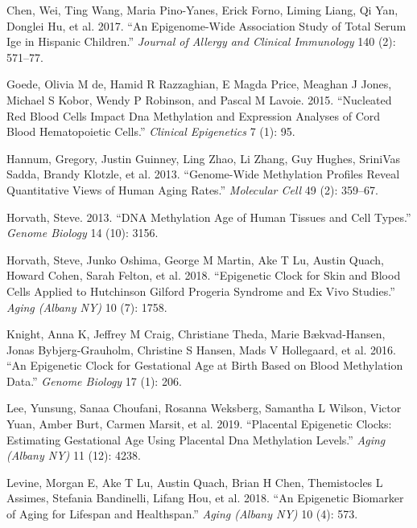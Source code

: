 \documentclass[]{article}
\begin{document}
\leavevmode\hypertarget{ref-chen2017epigenome}{}%
Chen, Wei, Ting Wang, Maria Pino-Yanes, Erick Forno, Liming Liang, Qi Yan, Donglei Hu, et al. 2017. ``An Epigenome-Wide Association Study of Total Serum Ige in Hispanic Children.'' \emph{Journal of Allergy and Clinical Immunology} 140 (2): 571--77.

\leavevmode\hypertarget{ref-de2015nucleated}{}%
Goede, Olivia M de, Hamid R Razzaghian, E Magda Price, Meaghan J Jones, Michael S Kobor, Wendy P Robinson, and Pascal M Lavoie. 2015. ``Nucleated Red Blood Cells Impact Dna Methylation and Expression Analyses of Cord Blood Hematopoietic Cells.'' \emph{Clinical Epigenetics} 7 (1): 95.

\leavevmode\hypertarget{ref-hannum2013genome}{}%
Hannum, Gregory, Justin Guinney, Ling Zhao, Li Zhang, Guy Hughes, SriniVas Sadda, Brandy Klotzle, et al. 2013. ``Genome-Wide Methylation Profiles Reveal Quantitative Views of Human Aging Rates.'' \emph{Molecular Cell} 49 (2): 359--67.

\leavevmode\hypertarget{ref-horvath2013dna}{}%
Horvath, Steve. 2013. ``DNA Methylation Age of Human Tissues and Cell Types.'' \emph{Genome Biology} 14 (10): 3156.

\leavevmode\hypertarget{ref-horvath2018epigenetic}{}%
Horvath, Steve, Junko Oshima, George M Martin, Ake T Lu, Austin Quach, Howard Cohen, Sarah Felton, et al. 2018. ``Epigenetic Clock for Skin and Blood Cells Applied to Hutchinson Gilford Progeria Syndrome and Ex Vivo Studies.'' \emph{Aging (Albany NY)} 10 (7): 1758.

\leavevmode\hypertarget{ref-knight2016epigenetic}{}%
Knight, Anna K, Jeffrey M Craig, Christiane Theda, Marie Bækvad-Hansen, Jonas Bybjerg-Grauholm, Christine S Hansen, Mads V Hollegaard, et al. 2016. ``An Epigenetic Clock for Gestational Age at Birth Based on Blood Methylation Data.'' \emph{Genome Biology} 17 (1): 206.

\leavevmode\hypertarget{ref-lee2019placental}{}%
Lee, Yunsung, Sanaa Choufani, Rosanna Weksberg, Samantha L Wilson, Victor Yuan, Amber Burt, Carmen Marsit, et al. 2019. ``Placental Epigenetic Clocks: Estimating Gestational Age Using Placental Dna Methylation Levels.'' \emph{Aging (Albany NY)} 11 (12): 4238.

\leavevmode\hypertarget{ref-levine2018epigenetic}{}%
Levine, Morgan E, Ake T Lu, Austin Quach, Brian H Chen, Themistocles L Assimes, Stefania Bandinelli, Lifang Hou, et al. 2018. ``An Epigenetic Biomarker of Aging for Lifespan and Healthspan.'' \emph{Aging (Albany NY)} 10 (4): 573.
\end{document}
